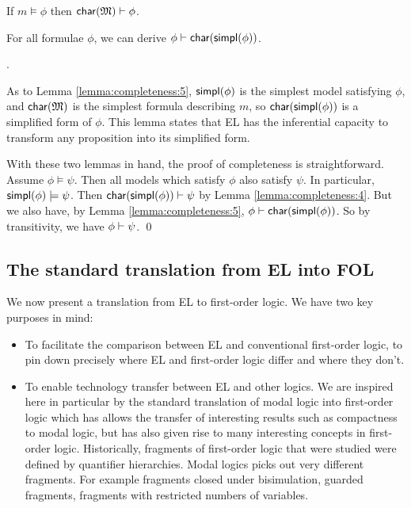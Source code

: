\begin{lemma}\label{lemma:completeness:4}
If $m \models \phi$ then $\mathsf{char}(\frak{M}) \vdash \phi$.
\end{lemma}

\begin{lemma}\label{lemma:completeness:5}
For all formulae $\phi$, we can derive $\phi \vdash \mathsf{char}(\mathsf{simpl}(\phi))$.
\end{lemma}

.

As to Lemma \ref{lemma:completeness:5}, $\mathsf{simpl}(\phi)$ is the simplest model
satisfying $\phi$, and $\mathsf{char}(\frak{M})$ is the simplest formula describing
$m$, so $\mathsf{char}(\mathsf{simpl}(\phi))$ is a simplified form of $\phi$. This lemma
states that EL has the inferential capacity to transform any
proposition into its simplified form.

With these two lemmas in hand, the proof of completeness is
straightforward.  Assume $\phi \models \psi$.  Then all models which satisfy
$\phi$ also satisfy $\psi$.  In particular, $\mathsf{simpl}(\phi) \models \psi$.  Then
$\mathsf{char}(\mathsf{simpl}(\phi)) \vdash \psi$ by Lemma \ref{lemma:completeness:4}.  But we
also have, by Lemma \ref{lemma:completeness:5}, $\phi \vdash
\mathsf{char}(\mathsf{simpl}(\phi)) $.  So by transitivity, we have $\phi \vdash \psi$.  \qed


\subsection{The standard translation from  EL into FOL}\label{standardTranslation}

We now present a translation from EL to first-order logic. We have two
key purposes in mind:

\begin{itemize}

\item To facilitate the comparison between EL and conventional
  first-order logic, to pin down precisely where EL and first-order
  logic differ and where they don't.

\item To enable technology transfer between EL and other logics. We
  are inspired here in particular by the standard translation of modal
  logic into first-order logic \cite{BlackburnP:modlog} which has
  allows the transfer of interesting results such as compactness to
  modal logic, but has also given rise to many interesting concepts in
  first-order logic.  Historically, fragments of first-order logic
  that were studied were defined by quantifier hierarchies. Modal
  logics picks out very different fragments. For example fragments
  closed under bisimulation, guarded fragments, fragments with
  restricted numbers of variables.

\end{itemize}

